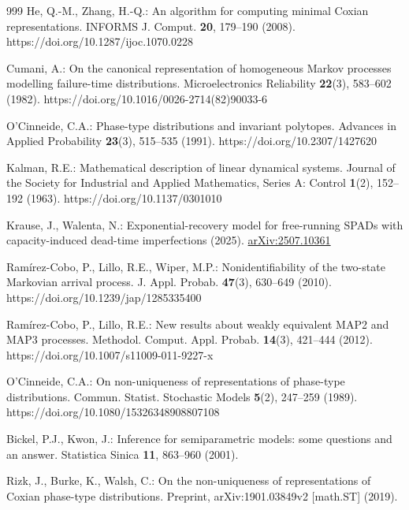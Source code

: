 \begin{thebibliography}{999}
He, Q.-M., Zhang, H.-Q.: An algorithm for computing minimal Coxian
representations. INFORMS J. Comput. \textbf{20}, 179--190 (2008).
https://doi.org/10.1287/ijoc.1070.0228

Cumani, A.: On the canonical representation of homogeneous Markov processes modelling failure-time distributions. Microelectronics Reliability \textbf{22}(3), 583--602 (1982). https://doi.org/10.1016/0026-2714(82)90033-6

O'Cinneide, C.A.: Phase-type distributions and invariant polytopes. Advances in Applied Probability \textbf{23}(3), 515--535 (1991). https://doi.org/10.2307/1427620

Kalman, R.E.: Mathematical description of linear dynamical systems. Journal of the Society for Industrial and Applied Mathematics, Series A: Control \textbf{1}(2), 152--192 (1963). https://doi.org/10.1137/0301010

Krause, J., Walenta, N.: Exponential-recovery model for free-running SPADs with capacity-induced dead-time imperfections (2025). \href{https://arxiv.org/abs/2507.10361}{arXiv:2507.10361}

Ram\'irez-Cobo, P., Lillo, R.E., Wiper, M.P.: Nonidentifiability of the two-state Markovian arrival process. J. Appl. Probab. \textbf{47}(3), 630--649 (2010). https://doi.org/10.1239/jap/1285335400

Ram\'irez-Cobo, P., Lillo, R.E.: New results about weakly equivalent MAP2 and MAP3 processes. Methodol. Comput. Appl. Probab. \textbf{14}(3), 421--444 (2012). https://doi.org/10.1007/s11009-011-9227-x

O'Cinneide, C.A.: On non-uniqueness of representations of phase-type
distributions. Commun. Statist. Stochastic Models \textbf{5}(2), 247--259
(1989). https://doi.org/10.1080/15326348908807108

Bickel, P.J., Kwon, J.: Inference for semiparametric models: some questions
and an answer. Statistica Sinica \textbf{11}, 863--960 (2001).

Rizk, J., Burke, K., Walsh, C.: On the non-uniqueness of representations of
Coxian phase-type distributions. Preprint, arXiv:1901.03849v2 [math.ST]
(2019).


\end{thebibliography}

